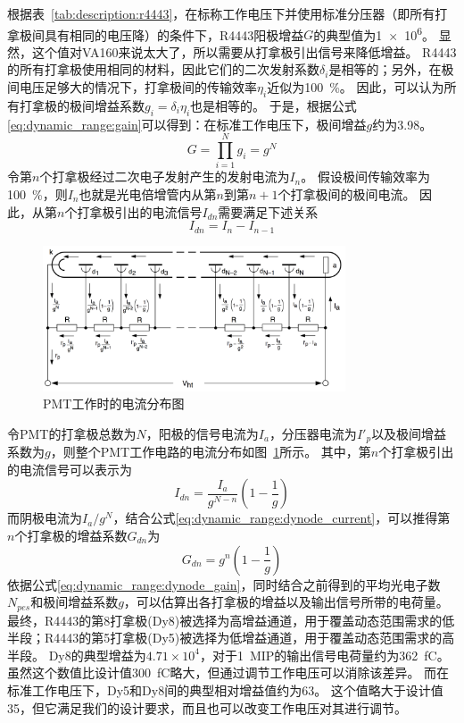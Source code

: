 根据表~\ref{tab:description:r4443}，在标称工作电压下并使用标准分压器（即所有打拿极间具有相同的电压降）的条件下，R4443阳极增益$G$的典型值为\SI{1e6}{}。
显然，这个值对VA160来说太大了，所以需要从打拿极引出信号来降低增益。
R4443的所有打拿极使用相同的材料，因此它们的二次发射系数$\delta_i$是相等的；另外，在极间电压足够大的情况下，打拿极间的传输效率$\eta_i$近似为\SI{100}{\percent}。
因此，可以认为所有打拿极的极间增益系数$g_i=\delta_i\eta_i$也是相等的。
于是，根据公式\ref{eq:dynamic_range:gain}可以得到：在标准工作电压下，极间增益$g$约为3.98。
\begin{equation}
	G = \prod_{i=1}^{N} g_i = g^N
	\label{eq:dynamic_range:gain}
\end{equation}
令第$n$个打拿极经过二次电子发射产生的发射电流为$I_n$。
假设极间传输效率为\SI{100}{\percent}，则$I_n$也就是光电倍增管内从第$n$到第$n+1$个打拿极间的极间电流。
因此，从第$n$个打拿极引出的电流信号$I_{dn}$需要满足下述关系
\begin{equation}
	I_{dn} = I_n - I_{n-1}
	\label{eq:dynamic_range:dynodes_relation}
\end{equation}
\begin{figure}[!htb]
	\centering
	\includegraphics[width=0.8\textwidth]{chap/dynamic_range/fig/pmt_current_distribution_photonics.png}
	\caption{PMT工作时的电流分布图}
	\label{fig:dynamic_range:current_distribution}
\end{figure}
令PMT的打拿极总数为$N$，阳极的信号电流为$I_a$，分压器电流为$I'_p$以及极间增益系数为$g$，则整个PMT工作电路的电流分布如图~\ref{fig:dynamic_range:current_distribution}所示。
其中，第$n$个打拿极引出的电流信号可以表示为
\begin{equation}
	I_{dn} = \frac{I_a}{g^{N-n}}(1-\frac{1}{g})
	\label{eq:dynamic_range:dynode_current}
\end{equation}
而阴极电流为$I_a/g^N$，结合公式\ref{eq:dynamic_range:dynode_current}，可以推得第$n$个打拿极的增益系数$G_{dn}$为
\begin{equation}
	G_{dn} = g^n(1-\frac{1}{g})
	\label{eq:dynamic_range:dynode_gain}
\end{equation}
依据公式\ref{eq:dynamic_range:dynode_gain}，同时结合之前得到的平均光电子数$N_{pes}$和极间增益系数$g$，可以估算出各打拿极的增益以及输出信号所带的电荷量。
最终，R4443的第8打拿极(Dy8)被选择为高增益通道，用于覆盖动态范围需求的低半段；R4443的第5打拿极(Dy5)被选择为低增益通道，用于覆盖动态范围需求的高半段。
Dy8的典型增益为$4.71\times10^4$，对于\SI{1}{MIP}的输出信号电荷量约为\SI{362}{\femto\coulomb}。
虽然这个数值比设计值\SI{300}{\femto\coulomb}略大，但通过调节工作电压可以消除该差异。
而在标准工作电压下，Dy5和Dy8间的典型相对增益值约为63。
这个值略大于设计值35，但它满足我们的设计要求，而且也可以改变工作电压对其进行调节。

